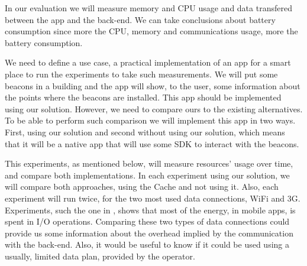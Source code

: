 In our evaluation we will measure memory and CPU usage
and data transfered between the app and the back-end.
We can take conclusions about battery consumption since
more the CPU, memory and communications usage,
more the battery consumption.

We need to define a use case, a practical implementation
of an app for a smart place to run the experiments
to take such measurements. We will put some beacons
in a building and the app will show, to the user,
some information about the points where the beacons
are installed.
This app should be implemented using our solution.
However, we need to compare ours to the existing
alternatives. To be able to perform such comparison
we will implement this app in two ways.
First, using our solution and second without using
our solution, which means that it will be a native
app that will use some SDK to interact with the
beacons.

This experiments, as mentioned below, 
will measure resources' usage over time, 
and compare both implementations. In each
experiment using our solution, we will
compare both approaches, using the Cache
and not using it. Also, each experiment
will run twice, for the two most used
data connections, WiFi and 3G.
Experiments, such the one
in \cite{Pathak2012}, shows that most of the energy, 
in mobile apps,
is spent in I/O operations.
Comparing these
two types of data connections could provide us
some information about the
overhead implied by the communication with
the back-end. Also, it would be useful to
know if it could be used using
a usually, limited data plan, provided by
the operator.

